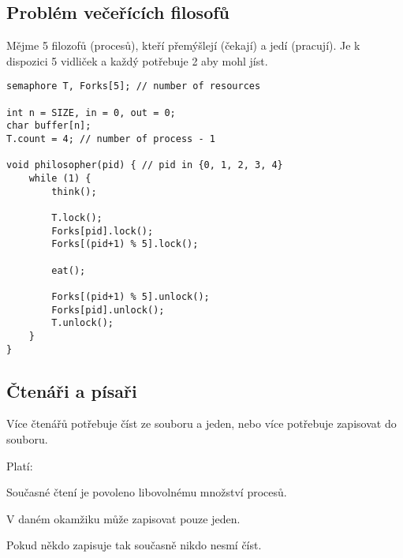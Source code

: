\subsection{Problém večeřících filosofů}

\begin{compactitem}
    \item Mějme 5 filozofů (procesů), kteří přemýšlejí (čekají) a jedí (pracují). Je k dispozici 5 vidliček a každý potřebuje 2 aby mohl jíst.
\end{compactitem}

\noindent\begin{minipage}{\linewidth}
\begin{lstlisting}[language=c_language, caption={Implementace problému večeřících filosofů s využitím semaforů.}]
semaphore T, Forks[5]; // number of resources

int n = SIZE, in = 0, out = 0;
char buffer[n];
T.count = 4; // number of process - 1

void philosopher(pid) { // pid in {0, 1, 2, 3, 4}
    while (1) {
        think();

        T.lock();
        Forks[pid].lock();
        Forks[(pid+1) % 5].lock();

        eat();

        Forks[(pid+1) % 5].unlock();
        Forks[pid].unlock();
        T.unlock();
    }
}
\end{lstlisting}
\end{minipage}

\subsection{Čtenáři a písaři}

\begin{compactitem}
    \item Více čtenářů potřebuje číst ze souboru a jeden, nebo více potřebuje zapisovat do souboru.
    \item Platí: \begin{compactitem}
        \item Současné čtení je povoleno libovolnému množství procesů.
        \item V daném okamžiku může zapisovat pouze jeden.
        \item Pokud někdo zapisuje tak současně nikdo nesmí číst.
    \end{compactitem}
\end{compactitem}

